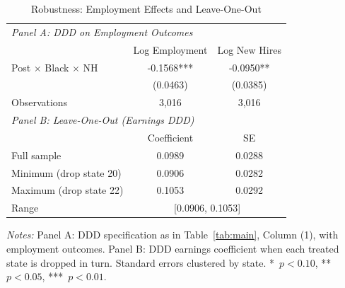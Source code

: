 
\begin{table}[t]
\centering
\caption{Robustness: Employment Effects and Leave-One-Out}
\label{tab:robust}
\begin{threeparttable}
\begin{tabular}{lcc}
\toprule
\multicolumn{3}{l}{\textit{Panel A: DDD on Employment Outcomes}} \\[3pt]
 & Log Employment & Log New Hires \\
\midrule
Post $\times$ Black $\times$ NH & -0.1568*** & -0.0950** \\
 & (0.0463) & (0.0385) \\
Observations & 3,016 & 3,016 \\[6pt]
\multicolumn{3}{l}{\textit{Panel B: Leave-One-Out (Earnings DDD)}} \\[3pt]
 & Coefficient & SE \\
\midrule
Full sample & 0.0989 & 0.0288 \\
Minimum (drop state 20) & 0.0906 & 0.0282 \\
Maximum (drop state 22) & 0.1053 & 0.0292 \\
Range & \multicolumn{2}{c}{[0.0906, 0.1053]} \\
\bottomrule
\end{tabular}
\begin{tablenotes}[flushleft]
\small
\item \textit{Notes:} Panel A: DDD specification as in Table~\ref{tab:main}, Column (1), with employment
outcomes. Panel B: DDD earnings coefficient when each treated state is dropped in turn.
Standard errors clustered by state.
*~$p<0.10$, **~$p<0.05$, ***~$p<0.01$.
\end{tablenotes}
\end{threeparttable}
\end{table}

